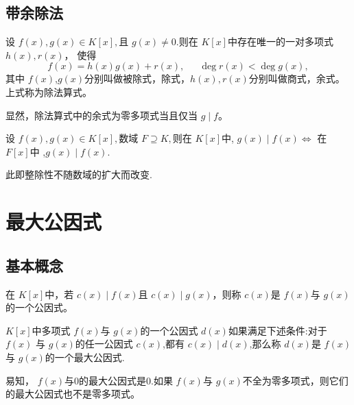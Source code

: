 \subsection{带余除法}
\begin{mythm}[带余除法]
    设 $f(x),g(x)\in K[x],$且 $g(x)\neq 0.$则在 $K[x]$中存在唯一的一对多项式 $h(x),r(x)$，
    使得
    \[f(x)=h(x)g(x)+r(x),\phantom{111}\deg r(x)<\deg g(x),\]
    其中 $f(x)$,$g(x)$分别叫做被除式，除式，$h(x),r(x)$分别叫做商式，余式。上式称为除法算式。
\end{mythm}
\begin{myrmk}
    显然，除法算式中的余式为零多项式当且仅当 $g\mid f$。
\end{myrmk}
\begin{myprop}
    设 $f(x),g(x)\in K[x],$数域 $F\supseteq K,$则在 $K[x]$中, $g(x)\mid f(x)\Leftrightarrow$
    在 $F[x]$中 ,$g(x)\mid f(x)$.
\end{myprop}
\begin{myrmk}
    此即整除性不随数域的扩大而改变.
\end{myrmk}
\section{最大公因式}
\subsection{基本概念}
\begin{mydef}[公因式]
  在 $K[x]$中，若 $c(x)\mid f(x)$且 $c(x)\mid g(x)$，则称 $c(x)$是 $f(x)$与 $g(x)$的一个公因式。  
\end{mydef}
\begin{mydef}[最大公因式]
    $K[x]$中多项式 $f(x)$与 $g(x)$的一个公因式 $d(x)$如果满足下述条件:对于 $f(x)$
    与 $g(x)$的任一公因式 $c(x)$,都有 $c(x)\mid d(x)$,那么称 $d(x)$是 $f(x)$与 $g(x)$的一个最大公因式.
\end{mydef}
易知， $f(x)$与0的最大公因式是0.如果 $f(x)$与 $g(x)$不全为零多项式，则它们的最大公因式也不是零多项式。

